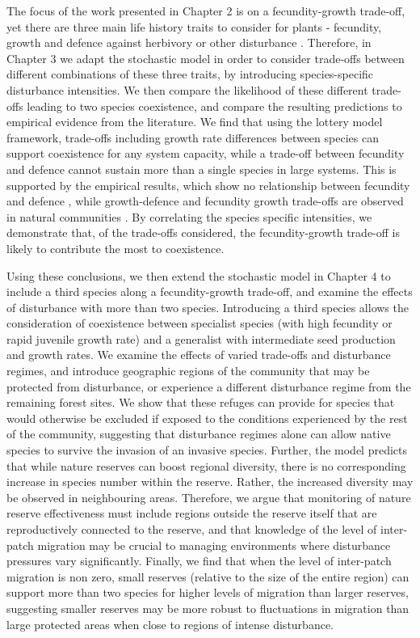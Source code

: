 The focus of the work presented in Chapter 2 is on a fecundity-growth trade-off, yet there are three main life history traits to consider for plants - fecundity, growth and defence against herbivory or other disturbance \citep{bazzaz1987allocating}. Therefore, in Chapter 3 we adapt the stochastic model in order to consider trade-offs between different combinations of these three traits, by introducing species-specific disturbance intensities. We then compare the likelihood of these different trade-offs leading to two species coexistence, and compare the resulting predictions to empirical evidence from the literature. We find that using the lottery model framework, trade-offs including growth rate differences between species can support coexistence for any system capacity, while a trade-off between fecundity and defence cannot sustain more than a single species in large systems. This is supported by the empirical results, which show no relationship between fecundity and defence \citep{martin2010divergence}, while growth-defence and fecundity growth trade-offs are observed in natural communities \citep[e.g.][]{stanton2002competition,turnbull1999seed,wright2010functional,fine2006growth}. By correlating the species specific intensities, we demonstrate that, of the trade-offs considered, the fecundity-growth trade-off is likely to contribute the most to coexistence.

Using these conclusions, we then extend the stochastic model in Chapter 4 to include a third species along a fecundity-growth trade-off, and examine the effects of disturbance with more than two species. Introducing a third species allows the consideration of coexistence between specialist species (with high fecundity or rapid juvenile growth rate) and a generalist with intermediate seed production and growth rates. We examine the effects of varied trade-offs and disturbance regimes, and introduce geographic regions of the community that may be protected from disturbance, or experience a different disturbance regime from the remaining forest sites. We show that these refuges can provide for species that would otherwise be excluded if exposed to the conditions experienced by the rest of the community, suggesting that disturbance regimes alone can allow native species to survive the invasion of an invasive species. Further, the model predicts that while nature reserves can boost regional diversity, there is no corresponding increase in species number within the reserve. Rather, the increased diversity may be observed in neighbouring areas. Therefore, we argue that monitoring of nature reserve effectiveness must include regions outside the reserve itself that are reproductively connected to the reserve, and that knowledge of the level of inter-patch migration may be crucial to managing environments where disturbance pressures vary significantly. Finally, we find that when the level of inter-patch migration is non zero, small reserves (relative to the size of the entire region) can support more than two species for higher levels of migration than larger reserves, suggesting smaller reserves may be more robust to fluctuations in migration than large protected areas when close to regions of intense disturbance.